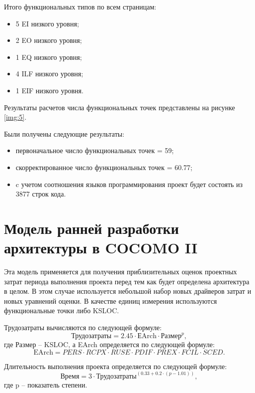 Итого функциональных типов по всем страницам:

\begin{itemize}
    \item 5 EI низкого уровня;
    \item 2 EO низкого уровня;
    \item 1 EQ низкого уровня;
    \item 4 ILF низкого уровня;
    \item 1 EIF низкого уровня.
\end{itemize}

Результаты расчетов числа функциональных точек представлены на рисунке \ref{img:5}.
\clearpage
{}

Были получены следующие результаты:

\begin{itemize}
    \item первоначальное число функциональных точек = 59;
    \item скорректированное число функциональных точек = 60.77;
    \item c учетом соотношения языков программирования проект будет состоять из 3877 строк кода.
\end{itemize}


\clearpage
\section{Модель ранней разработки архитектуры в COCOMO II}

Эта модель применяется для получения приблизительных оценок проектных затрат периода выполнения проекта перед тем как будет определена архитектура в целом. В этом случае используется небольшой набор новых драйверов затрат и новых уравнений оценки. В качестве единиц измерения используются функциональные точки либо KSLOC.

Трудозатраты вычисляются по следующей формуле:
\begin{equation}
    \text{Трудозатраты} = 2.45 \cdot \text{ЕArch} \cdot \text{Размер}^{p},
\end{equation}
где Размер -- KSLOC, а EArch определяется по следующей формуле:
\begin{equation}
    \text{EArch} = PERS \cdot RCPX \cdot RUSE \cdot PDIF \cdot PREX \cdot FCIL \cdot SCED.
\end{equation}

Длительность выполнения проекта определяется по следующей формуле:
\begin{equation}
    \text{Время} = 3 \cdot \text{Трудозатраты}^{(0.33 + 0.2 \cdot (p - 1.01))},
\end{equation}
где p -- показатель степени. 


